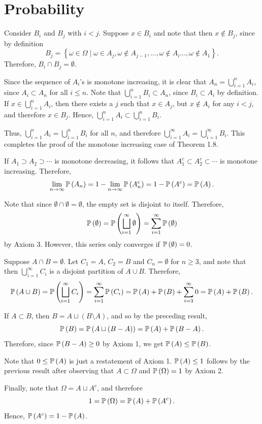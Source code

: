 \chapter{Probability}

\begin{ex}
  Consider $B_i$ and $B_j$ with $i<j$. Suppose $x\in B_i$ and note that then
  $x\not\in B_j$, since by definition
  $$
    B_j=\left\{\omega\in\Omega\mid
    \omega\in A_j,\omega\not\in A_{j-1},\ldots,
    \omega\not\in A_{i}\ldots,\omega\not\in A_{1}\right\}.
  $$
  Therefore, $B_i\cap B_j=\emptyset$.

  Since the sequence of $A_i$'s is monotone increasing, it is clear that
  $A_n=\bigcup_{i=1}^n A_i$, since $A_i\subset A_n$ for all $i\leq n$. Note that
  $\bigcup_{i=1}^n B_i\subset A_n$, since $B_i\subset A_i$
  by definition. If $x\in \bigcup_{i=1}^n A_i$, then there exists a $j$ such
  that $x\in A_j$, but $x\not\in A_i$ for any $i<j$, and therefore $x\in B_j$.
  Hence, $\bigcup_{i=1}^n A_i\subset\bigcup_{i=1}^n B_i$.

  Thus, $\bigcup_{i=1}^n A_i=\bigcup_{i=1}^n B_i$ for all $n$, and therefore
  $\bigcup_{i=1}^\infty A_i=\bigcup_{i=1}^\infty B_i$. This completes the proof
  of the monotone increasing case of Theorem 1.8.

  If $A_1\supset A_2\supset\cdots$ is monotone decreasing, it follows that
  $A_1^c\subset A_2^c\subset\cdots$ is monotone increasing. Therefore,
  \[
    \lim_{n\to\infty}\P{A_n}
    =1-\lim_{n\to\infty}\P{A_n^c}
    =1-\P{A^c}
    =\P{A}.
  \]
\end{ex}

\begin{ex}
  Note that since $\emptyset\cap\emptyset=\emptyset$, the empty set is disjoint
  to itself. Therefore,
  \[
    \P{\emptyset}
    =\P{\bigsqcup_{i=1}^\infty \emptyset}
    =\sum_{i=1}^\infty\P{\emptyset}
  \]
  by Axiom 3. However, this series only converges if $\P{\emptyset}=0$.

  Suppose $A\cap B=\emptyset$. Let $C_1=A$, $C_2=B$ and $C_n=\emptyset$ for
  $n\geq 3$, and note that then $\bigcup_{i=1}^\infty C_i$ is a disjoint
  partition of $A\cup B$. Therefore,
  \[
    \P{A\cup B}
    =\P{\bigsqcup_{i=1}^\infty C_i}
    =\sum_{i=1}^\infty \P{C_i}
    =\P{A}+\P{B}+\sum_{i=3}^\infty 0
    =\P{A}+\P{B}.
  \]

  If $A\subset B$, then $B=A\sqcup (B\setminus A)$, and so by the preceding
  result,
  \[
    \P{B}=\P{A\sqcup (B\setminus A)}=\P{A}+\P{B\setminus A}.
  \]
  Therefore, since $\P{B\setminus A}\geq 0$ by Axiom 1, we get
  $\P{A}\leq \P{B}$.

  Note that $0\leq \P{A}$ is just a restatement of Axiom 1. $\P{A}\leq 1$
  follows by the previous result after observing that $A\subset \Omega$ and
  $\P{\Omega}=1$ by Axiom 2.

  Finally, note that $\Omega=A\sqcup A^c$, and therefore
  \[
    1=\P{\Omega}=\P{A}+\P{A^c}.
  \]
  Hence, $\P{A^c}=1-\P{A}$.
\end{ex}

